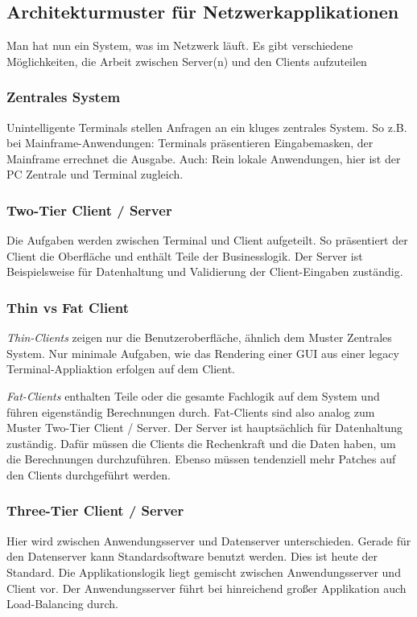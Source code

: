 \documentclass{panikzettel}
\begin{document}
\subsection{Architekturmuster für Netzwerkapplikationen}
Man hat nun ein System, was im Netzwerk läuft.
Es gibt verschiedene Möglichkeiten, die Arbeit zwischen Server(n) und den Clients aufzuteilen

\subsubsection{Zentrales System}
Unintelligente Terminals stellen Anfragen an ein kluges zentrales System.
So z.B. bei Mainframe-Anwendungen: Terminals präsentieren Eingabemasken, der Mainframe errechnet die Ausgabe.
Auch: Rein lokale Anwendungen, hier ist der PC Zentrale und Terminal zugleich.

\subsubsection{Two-Tier Client / Server}
Die Aufgaben werden zwischen Terminal und Client aufgeteilt.
So präsentiert der Client die Oberfläche und enthält Teile der Businesslogik.
Der Server ist Beispielsweise für Datenhaltung und Validierung der Client-Eingaben zuständig.

\subsubsection{Thin vs Fat Client}
\emph{Thin-Clients} zeigen nur die Benutzeroberfläche, ähnlich dem Muster Zentrales System.
Nur minimale Aufgaben, wie das Rendering einer GUI aus einer legacy Terminal-Appliaktion erfolgen auf dem Client.

\emph{Fat-Clients} enthalten Teile oder die gesamte Fachlogik auf dem System und führen eigenständig Berechnungen durch.
Fat-Clients sind also analog zum Muster Two-Tier Client / Server.
Der Server ist hauptsächlich für Datenhaltung zuständig.
Dafür müssen die Clients die Rechenkraft und die Daten haben, um die Berechnungen durchzuführen.
Ebenso müssen tendenziell mehr Patches auf den Clients durchgeführt werden.

\subsubsection{Three-Tier Client / Server}
Hier wird zwischen Anwendungsserver und Datenserver unterschieden.
Gerade für den Datenserver kann Standardsoftware benutzt werden.
Dies ist heute der Standard.
Die Applikationslogik liegt gemischt zwischen Anwendungsserver und Client vor.
Der Anwendungsserver führt bei hinreichend großer Applikation auch Load-Balancing durch. 
\end{document}
